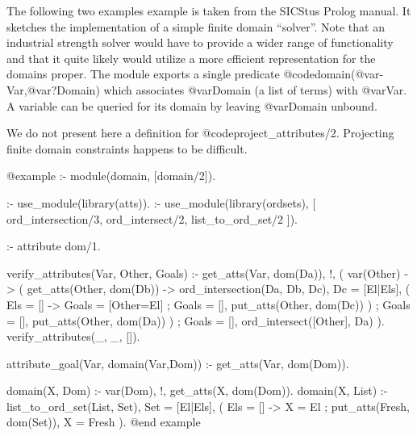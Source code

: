 {{{{{{{{{The following two examples example is taken from the SICStus Prolog manual. It
sketches the implementation of a simple finite domain ``solver''.  Note
that an industrial strength solver would have to provide a wider range
of functionality and that it quite likely would utilize a more efficient
representation for the domains proper.  The module exports a single
predicate @code{domain(@var{-Var},@var{?Domain})} which associates
@var{Domain} (a list of terms) with @var{Var}.  A variable can be
queried for its domain by leaving @var{Domain} unbound.

We do not present here a definition for @code{project_attributes/2}.
Projecting finite domain constraints happens to be difficult.


@example
:- module(domain, [domain/2]).

:- use_module(library(atts)).
:- use_module(library(ordsets), [
        ord_intersection/3,
        ord_intersect/2,
        list_to_ord_set/2
   ]).

:- attribute dom/1.

verify_attributes(Var, Other, Goals) :-
        get_atts(Var, dom(Da)), !,          %
        (   var(Other) ->                   %
            (   get_atts(Other, dom(Db)) -> %
                ord_intersection(Da, Db, Dc),
                Dc = [El|Els],              %
                (   Els = [] ->             %
                    Goals = [Other=El]      %
                ;   Goals = [],
                    put_atts(Other, dom(Dc))%
                )
            ;   Goals = [],
                put_atts(Other, dom(Da))    %
            )
        ;   Goals = [],
            ord_intersect([Other], Da)      %
        ).
verify_attributes(_, _, []).                %

attribute_goal(Var, domain(Var,Dom)) :-     %
        get_atts(Var, dom(Dom)).

domain(X, Dom) :-
        var(Dom), !,
        get_atts(X, dom(Dom)).
domain(X, List) :-
        list_to_ord_set(List, Set),
        Set = [El|Els],                     %
        (   Els = [] ->                     %
            X = El                          %
        ;   put_atts(Fresh, dom(Set)),
            X = Fresh                       %
        ).
@end example

}}}}}}}}}

